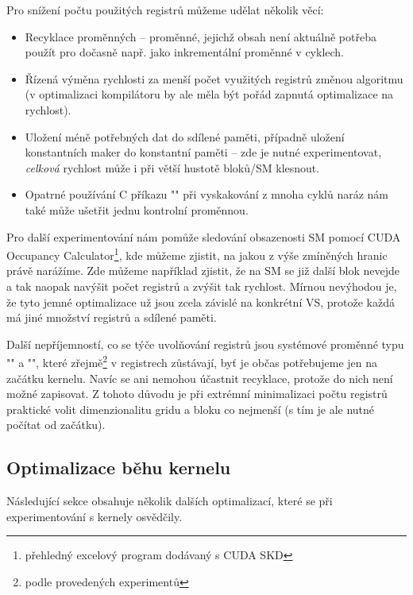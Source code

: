         Pro snížení počtu použitých registrů můžeme udělat několik věcí:
        \begin{itemize}
          \item Recyklace proměnných -- proměnné, jejichž obsah není aktuálně potřeba použít pro dočasně např. jako inkrementální proměnné v cyklech.
          \item Řízená výměna rychlosti za menší počet využitých registrů změnou algoritmu (v optimalizaci kompilátoru by ale měla být pořád zapnutá optimalizace na rychlost).
          \item Uložení méně potřebných dat do sdílené paměti, případně uložení konstantních maker do konstantní paměti -- zde je nutné experimentovat, \emph{celková} rychlost může i při větší hustotě bloků/SM klesnout.
          \item Opatrné používání C příkazu \Vr"" při vyskakování z mnoha cyklů naráz nám také může ušetřit jednu kontrolní proměnnou.
        \end{itemize}

        Pro další experimentování nám pomůže sledování obsazenosti SM pomocí CUDA Occupancy Calculator\footnote{přehledný excelový program dodávaný s CUDA SKD}, kde můžeme zjistit, na jakou z výše zmíněných hranic právě narážíme. Zde můžeme například zjistit, že na SM se již další blok nevejde a tak naopak navýšit počet registrů a zvýšit tak rychlost. Mírnou nevýhodou je, že tyto jemné optimalizace už jsou zcela závislé na konkrétní VS, protože každá má jiné množství registrů a sdílené paměti.

        Další nepříjemností, co se týče uvolňování registrů jsou systémové proměnné typu \Vr"" a \Vr"", které zřejmě\footnote{podle provedených experimentů} v registrech zůstávají, byť je občas potřebujeme jen na začátku kernelu. Navíc se ani nemohou účastnit recyklace, protože do nich není možné zapisovat. Z tohoto důvodu je při extrémní minimalizaci počtu registrů praktické volit dimenzionalitu gridu a bloku co nejmenší (s tím je ale nutné počítat od začátku).

    \subsection{Optimalizace běhu kernelu}

    Následující sekce obsahuje několik dalších optimalizací, které se při experimentování s kernely osvědčily. 

